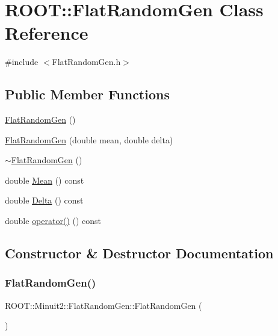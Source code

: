 \hypertarget{classROOT_1_1Minuit2_1_1FlatRandomGen}{}\section{R\+O\+OT\+:\+:Flat\+Random\+Gen Class Reference}
\label{classROOT_1_1Minuit2_1_1FlatRandomGen}


{\ttfamily \#include $<$Flat\+Random\+Gen.\+h$>$}

\subsection*{Public Member Functions}
\begin{DoxyCompactItemize}
\item 
\mbox{\hyperlink{classROOT_1_1Minuit2_1_1FlatRandomGen_a238bf80afeb93f2ecc95c8beedd39226}{Flat\+Random\+Gen}} ()
\item 
\mbox{\hyperlink{classROOT_1_1Minuit2_1_1FlatRandomGen_aeaa2e6e985b742a44530f12b4a1b3198}{Flat\+Random\+Gen}} (double mean, double delta)
\item 
\mbox{\hyperlink{classROOT_1_1Minuit2_1_1FlatRandomGen_a333b1c673238489f20dfba12ee1eac14}{$\sim$\+Flat\+Random\+Gen}} ()
\item 
double \mbox{\hyperlink{classROOT_1_1Minuit2_1_1FlatRandomGen_ab934b4a66f13eaaf30c9a9280c7ddb10}{Mean}} () const
\item 
double \mbox{\hyperlink{classROOT_1_1Minuit2_1_1FlatRandomGen_ad277acd252616d99e83d3438065cc154}{Delta}} () const
\item 
double \mbox{\hyperlink{classROOT_1_1Minuit2_1_1FlatRandomGen_ac04ef969864af18fdfdc104f2491e031}{operator()}} () const
\end{DoxyCompactItemize}


\subsection{Constructor \& Destructor Documentation}
\mbox{\label{classROOT_1_1Minuit2_1_1FlatRandomGen_a238bf80afeb93f2ecc95c8beedd39226}} 
\subsubsection{\texorpdfstring{FlatRandomGen()}{FlatRandomGen()}\hspace{0.1cm}{\footnotesize\ttfamily [1/2]}}
{\footnotesize\ttfamily R\+O\+O\+T\+::\+Minuit2\+::\+Flat\+Random\+Gen\+::\+Flat\+Random\+Gen (\begin{DoxyParamCaption}{ }\end{DoxyParamCaption})\hspace{0.3cm}{\ttfamily [inline]}}

